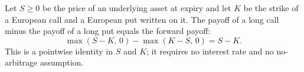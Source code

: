 \documentclass{article}
\begin{document}
\begin{theorem}\label{thm:putcall}
Let $S \ge 0$ be the price of an underlying asset at expiry and let $K$ be the strike of a
European call and a European put written on it. The payoff of a long call minus the payoff
of a long put equals the forward payoff:
\begin{equation}\label{eq:putcall}
\max(S - K,\, 0) - \max(K - S,\, 0) = S - K .
\end{equation}
This is a pointwise identity in $S$ and $K$; it requires no interest rate and no
no-arbitrage assumption.
\end{theorem}
\end{document}
